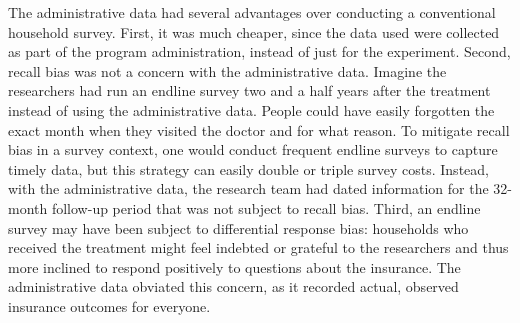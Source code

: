 \documentclass[
]{book}
\begin{document}
The administrative data had several advantages over conducting a conventional household survey. First, it was much cheaper, since the data used were collected as part of the program administration, instead of just for the experiment. Second, recall bias was not a concern with the administrative data. Imagine the researchers had run an endline survey two and a half years after the treatment instead of using the administrative data. People could have easily forgotten the exact month when they visited the doctor and for what reason. To mitigate recall bias in a survey context, one would conduct frequent endline surveys to capture timely data, but this strategy can easily double or triple survey costs. Instead, with the administrative data, the research team had dated information for the 32-month follow-up period that was not subject to recall bias. Third, an endline survey may have been subject to differential response bias: households who received the treatment might feel indebted or grateful to the researchers and thus more inclined to respond positively to questions about the insurance. The administrative data obviated this concern, as it recorded actual, observed insurance outcomes for everyone.
\end{document}
